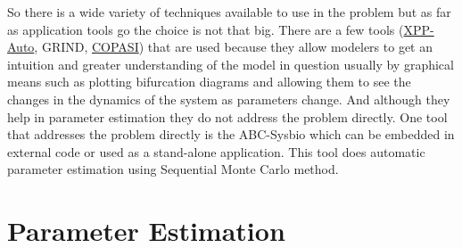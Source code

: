 \documentclass[12pt,a4paper,titlepage]{article}
\begin{document}
So there is a wide variety of techniques available to use in the problem but as far as application tools go the choice is not that big. There are a few tools (\href{http://www.math.pitt.edu/~bard/xpp/xpp.html}{XPP-Auto}, GRIND, \href{http://www.copasi.org/tiki-view_articles.php}{COPASI}) that are used because they allow modelers to get an intuition and greater understanding of the model in question usually by graphical means such as plotting bifurcation diagrams and allowing them to see the changes in the dynamics of the system as parameters change. And although they help in parameter estimation they do not address the problem directly. One tool that addresses the problem directly is the ABC-Sysbio\cite{liebe2010abcpy} which can be embedded in external code or used as a stand-alone application. This tool does automatic parameter estimation using Sequential Monte Carlo method.




\section{Parameter Estimation}
\end{document}
